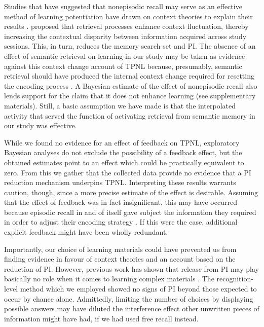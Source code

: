 \documentclass[../main.tex]{subfiles}
\begin{document}
Studies that have suggested that nonepisodic recall may serve as an effective
method of learning potentiation have drawn on context theories to explain 
their results \citep{divisRetrievalSpeedsContext2014, 
pastotterRetrievalLearningFacilitates2011}. 
\cite{divisRetrievalSpeedsContext2014} proposed that retrieval processes 
enhance context fluctuation, thereby increasing the contextual disparity 
between information acquired across study sessions. This, in turn, reduces 
the memory search set and PI. The absence of an effect of semantic retrieval 
on learning in our study may be taken as evidence against this context 
change account of TPNL because, presumably, semantic retrieval should have 
produced the internal context change required for resetting the encoding 
process \citep{pastotterRetrievalLearningFacilitates2011}. A Bayesian 
estimate of the effect of nonepisodic recall also lends support for the 
claim that it does not enhance learning (see supplementary materials). 
Still, a basic assumption we have made is that the interpolated activity 
that served the function of activating retrieval from semantic memory in our 
study was effective. 

While we found no evidence for an effect of feedback on TPNL, exploratory 
Bayesian analyses do not exclude the possibility of a feedback effect, but 
the obtained estimates point to an effect which could be practically 
equivalent to zero. From this we gather that the collected data provide no 
evidence that a PI reduction mechanism underpins TPNL. Interpreting these 
results warrants caution, though, since a more precise estimate of the 
effect is desirable. Assuming that the effect of feedback was in fact 
insignificant, this may have occurred because episodic recall in and of 
itself gave subject the information they required in order to adjust their 
encoding strategy \citep{kornellUnsuccessfulRetrievalAttempts2009}. If this 
were the case, additional explicit feedback might have been wholly redundant.

Importantly, our choice of learning materials could have prevented us from 
finding evidence in favour of context theories and an account based on the 
reduction of PI. However, previous work has shown that release from PI may 
play basically no role when it comes to learning complex materials 
\citep{divisRetrievalSpeedsContext2014, wissmanInterimTestEffect2011}. The 
recognition-level method which we employed showed no signs of PI beyond 
those expected to occur by chance alone. Admittedly, limiting the number of 
choices by displaying possible answers may have diluted the interference 
effect other unwritten pieces of information might have had, if we had used 
free recall instead.
\end{document}
